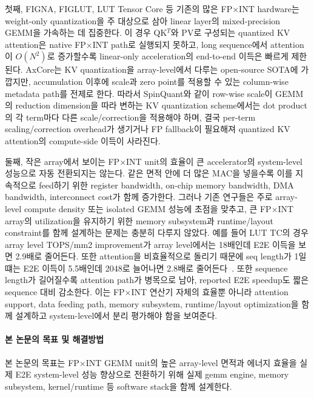 \documentclass[11pt]{article}
\newcommand{\todo}[1]{\textcolor{red}{[TODO: #1]}}
\newcommand{\fpint}{FP$\times$INT}
\begin{document}
첫째, FIGNA, FIGLUT, LUT Tensor Core 등 기존의 많은 \fpint{} hardware는 weight-only quantization을 주 대상으로 삼아 linear layer의 mixed-precision GEMM을 가속하는 데 집중한다.
이 경우 QK$^T$와 PV로 구성되는 quantized KV attention은 native \fpint{} path로 실행되지 못하고, long sequence에서 attention이 $O(N^2)$로 증가할수록 linear-only acceleration의 end-to-end 이득은 빠르게 제한된다.
AxCore는 KV quantization을 array-level에서 다루는 open-source SOTA에 가깝지만, accumulation 이후에 scale과 zero point를 적용할 수 있는 column-wise metadata path를 전제로 한다.
따라서 SpinQuant와 같이 row-wise scale이 GEMM의 reduction dimension을 따라 변하는 KV quantization scheme에서는 dot product의 각 term마다 다른 scale/correction을 적용해야 하며, 결국 per-term scaling/correction overhead가 생기거나 FP fallback이 필요해져
quantized KV attention의 compute-side 이득이 사라진다.

둘째, 작은 array에서 보이는 \fpint{} unit의 효율이 큰 accelerator의 system-level 성능으로 자동 전환되지는 않는다.
같은 면적 안에 더 많은 MAC을 넣을수록 이를 지속적으로 feed하기 위한 register bandwidth, on-chip memory bandwidth, DMA bandwidth, interconnect cost가 함께 증가한다.
그러나 기존 연구들은 주로 array-level compute density 또는 isolated GEMM 성능에 초점을 맞추고, 큰 \fpint{} array의 utilization을 유지하기 위한 memory subsystem과 runtime/layout constraint를 함께 설계하는 문제는 충분히 다루지 않았다.
예를 들어 LUT TC의 경우 array level TOPS/mm2 improvement가 array level에서는 18배인데 E2E 이득을 보면 2.9배로 줄어든다. 또한 attention을 비효율적으로 돌리기 때문에 seq length가 1일 떄는 E2E 이득이 5.5배인데 2048로 늘어나면 2.8배로 줄어든다~\cite{}.
또한 sequence length가 길어질수록 attention path가 병목으로 남아, reported E2E speedup도 짧은 sequence 대비 감소한다.
이는 \fpint{} 연산기 자체의 효율뿐 아니라 attention support, data feeding path, memory subsystem, runtime/layout optimization을 함께 설계하고 system-level에서 분리 평가해야 함을 보여준다.


\paragraph{본 논문의 목표 및 해결방법}
본 논문의 목표는 \fpint{} GEMM unit의 높은 array-level 면적과 에너지 효율을 실제 E2E system-level 성능 향상으로 전환하기 위해 실제 gemm engine, memory subsystem, kernel/runtime 등 software stack을 함께 설계한다.
\end{document}
